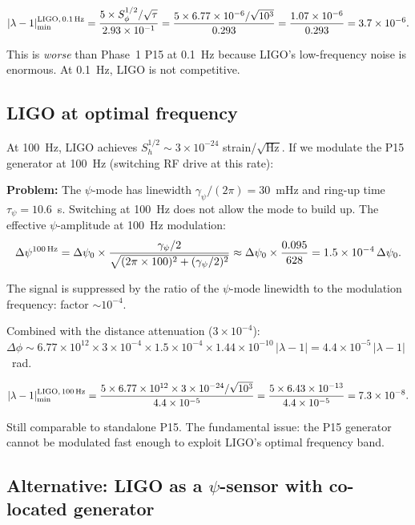 \documentclass[11pt]{article}
\newcommand{\ee}[1]{\times 10^{#1}}
\newcommand{\lam}{\lambda}
\newcommand{\gpsi}{\gamma_\psi}
\begin{document}
\begin{equation}
|\lam-1|_{\rm min}^{\rm LIGO,\,0.1\,Hz} = \frac{5 \times S_\phi^{1/2}/\sqrt{\tau}}
{2.93\ee{-1}}
= \frac{5 \times 6.77\ee{-6}/\sqrt{10^3}}{0.293}
= \frac{1.07\ee{-6}}{0.293} = 3.7\ee{-6}.
\end{equation}

This is \textit{worse} than Phase~1 P15 at 0.1~Hz because LIGO's
low-frequency noise is enormous. At 0.1~Hz, LIGO is not competitive.

\subsection{LIGO at optimal frequency}

At 100~Hz, LIGO achieves $S_h^{1/2} \sim 3\ee{-24}$
strain/$\sqrt{\text{Hz}}$. If we modulate the P15 generator at
100~Hz (switching RF drive at this rate):

\textbf{Problem:} The $\psi$-mode has linewidth $\gpsi/(2\pi)
= 30$~mHz and ring-up time $\tau_\psi = 10.6$~s. Switching at
100~Hz does not allow the mode to build up. The effective
$\psi$-amplitude at 100~Hz modulation:
\begin{equation}
\Delta\psi^{\rm 100\,Hz} = \Delta\psi_0 \times \frac{\gpsi/2}
{\sqrt{(2\pi \times 100)^2 + (\gpsi/2)^2}}
\approx \Delta\psi_0 \times \frac{0.095}{628} = 1.5\ee{-4}\,\Delta\psi_0.
\end{equation}

The signal is suppressed by the ratio of the $\psi$-mode linewidth
to the modulation frequency: factor $\sim 10^{-4}$.

Combined with the distance attenuation ($3\ee{-4}$):
$\Delta\phi \sim 6.77\ee{12} \times 3\ee{-4} \times 1.5\ee{-4}
\times 1.44\ee{-10}\,|\lam-1| = 4.4\ee{-5}\,|\lam-1|$~rad.

\begin{equation}
|\lam-1|_{\rm min}^{\rm LIGO,\,100\,Hz}
= \frac{5 \times 6.77\ee{12} \times 3\ee{-24}/\sqrt{10^3}}
{4.4\ee{-5}}
= \frac{5 \times 6.43\ee{-13}}{4.4\ee{-5}} = 7.3\ee{-8}.
\end{equation}

Still comparable to standalone P15. The fundamental issue: the
P15 generator cannot be modulated fast enough to exploit LIGO's
optimal frequency band.

\subsection{Alternative: LIGO as a $\psi$-sensor with co-located generator}
\end{document}
